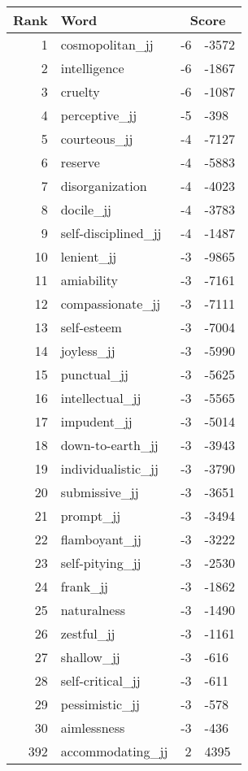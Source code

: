 \begin{longtable}[!htbp]{| rlr@{.}l |}
    \hline
    \textbf{Rank} & \textbf{Word} & \multicolumn{2}{c|}{\textbf{Score}} \\
    \hline
    \endhead
    1 & cosmopolitan\_jj & -6 & -3572 \\
    2 & intelligence & -6 & -1867 \\
    3 & cruelty & -6 & -1087 \\
    4 & perceptive\_jj & -5 & -398 \\
    5 & courteous\_jj & -4 & -7127 \\
    6 & reserve & -4 & -5883 \\
    7 & disorganization & -4 & -4023 \\
    8 & docile\_jj & -4 & -3783 \\
    9 & self-disciplined\_jj & -4 & -1487 \\
    10 & lenient\_jj & -3 & -9865 \\
    11 & amiability & -3 & -7161 \\
    12 & compassionate\_jj & -3 & -7111 \\
    13 & self-esteem & -3 & -7004 \\
    14 & joyless\_jj & -3 & -5990 \\
    15 & punctual\_jj & -3 & -5625 \\
    16 & intellectual\_jj & -3 & -5565 \\
    17 & impudent\_jj & -3 & -5014 \\
    18 & down-to-earth\_jj & -3 & -3943 \\
    19 & individualistic\_jj & -3 & -3790 \\
    20 & submissive\_jj & -3 & -3651 \\
    21 & prompt\_jj & -3 & -3494 \\
    22 & flamboyant\_jj & -3 & -3222 \\
    23 & self-pitying\_jj & -3 & -2530 \\
    24 & frank\_jj & -3 & -1862 \\
    25 & naturalness & -3 & -1490 \\
    26 & zestful\_jj & -3 & -1161 \\
    27 & shallow\_jj & -3 & -616 \\
    28 & self-critical\_jj & -3 & -611 \\
    29 & pessimistic\_jj & -3 & -578 \\
    30 & aimlessness & -3 & -436 \\
    392 & accommodating\_jj & 2 & 4395 \\

\end{longtable}
